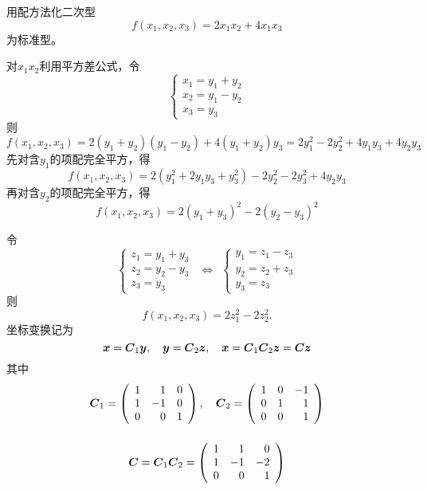 \begin{frame}
  
    \begin{li}
      用配方法化二次型
      $$
      f(x_1,x_2,x_3)=2x_1x_2+4x_1x_3
      $$
      为标准型。
    \end{li}
    \pause
    \begin{jie}
    对$x_1x_2$利用平方差公式，令
    $$
    \left\{
    \begin{array}{l}
      x_1=y_1+y_2\\
      x_2=y_1-y_2\\
      x_3=y_3
    \end{array}
    \right.
    $$
    则
    $$
    f(x_1,x_2,x_3)=2(y_1+y_2)(y_1-y_2)+4(y_1+y_2)y_3=2y_1^2-2y_2^2+4y_1y_3+4y_2y_3
    $$
    \pause
    先对含$y_1$的项配完全平方，得
    $$
    f(x_1,x_2,x_3)=2(y_1^2+2y_1y_3+y_3^2)-2y_2^2-2y_3^2+4y_2y_3
    $$
    再对含$y_2$的项配完全平方，得
    $$
    f(x_1,x_2,x_3)=2(y_1+y_3)^2-2(y_2-y_3)^2
    $$
    \end{jie}
  
\end{frame}

\begin{frame}
  
    令
    $$
    \left\{
    \begin{array}{l}
      z_1=y_1+y_3\\
      z_2=y_2-y_3\\
      z_3=y_3
    \end{array}
    \right. ~~\Longleftrightarrow~~
    \left\{
    \begin{array}{l}
      y_1=z_1-z_3\\
      y_2=z_2+z_3\\
      y_3=z_3
    \end{array}
    \right.
    $$
    则
    $$
    f(x_1,x_2,x_3)=2z_1^2-2z_2^2.
    $$\pause
    坐标变换记为
    $$
    {\boldsymbol{x}}=\boldsymbol{C}_1{\boldsymbol{y}}, \quad  {\boldsymbol{y}}=\boldsymbol{C}_2{\boldsymbol{z}}, \quad {\boldsymbol{x}}=\boldsymbol{C}_1\boldsymbol{C}_2{\boldsymbol{z}}=\boldsymbol{C}{\boldsymbol{z}}
    $$
    其中
    $$
    \begin{array}{c}
      \boldsymbol{C}_1=\left(
      \begin{array}{rrr}
        1&1&0\\
        1&-1&0\\
        0&0&1
      \end{array}
      \right),
      \quad\boldsymbol{C}_2=\left(
      \begin{array}{rrr}
        1&0&-1\\
        0&1&1\\
        0&0&1
      \end{array}
      \right)
      \\[0.4in]
      \boldsymbol{C}=\boldsymbol{C}_1\boldsymbol{C}_2=\left(
      \begin{array}{rrr}
        1&1&0\\
        1&-1&-2\\
        0&0&1
      \end{array}
      \right)      
    \end{array}
    $$
  
\end{frame}

